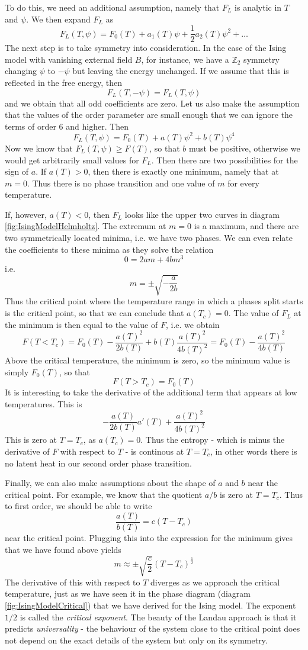 \documentclass[a4paper, draft]{article}
\theoremstyle{own}
\theoremstyle{remark}
\newcommand{\Z}{\mathbb{Z}}
\begin{document}
To do this, we need an additional assumption, namely that $F_L$ is analytic in $T$ and $\psi$. We then expand $F_L$ as
$$
F_L(T, \psi) = F_0(T) + a_1(T) \psi + \frac{1}{2} a_2(T) \psi^2 + \dots
$$
The next step is to take symmetry into consideration. In the case of the Ising model with vanishing external field $B$, for instance, we have a $\Z_2$ symmetry changing $\psi$ to $-\psi$ but leaving the energy unchanged. If we assume that this is reflected in the free energy, then
$$
F_L(T, -\psi) = F_L(T, \psi)
$$
and we obtain that all odd coefficients are zero. Let us also make the assumption that the values of the order parameter are small enough that we can ignore the terms of order 6 and higher. Then
$$
F_L(T, \psi) = F_0(T) + a(T) \psi^2 + b(T)\psi^4
$$
Now we know that $F_L(T, \psi) \geq F(T)$, so that $b$ must be positive, otherwise we would get arbitrarily small values for $F_L$. Then there are two possibilities for the sign of $a$. If $a(T) > 0$, then there is exactly one minimum, namely that at $m = 0$. Thus there is no phase transition and one value of $m$ for every temperature. 

If, however, $a(T) < 0$, then $F_L$ looks like the upper two curves in diagram \ref{fig:IsingModelHelmholtz}. The extremum at $m = 0$ is a maximum, and there are two symmetrically located minima, i.e. we have two phases. We can even relate the coefficients to these minima as they solve the relation
$$
0 = 2 a m + 4 b m^3
$$
i.e.
$$
m = \pm \sqrt{- \frac{a}{2b}}
$$	
Thus the critical point where the temperature range in which a phases split starts is the critical point, so that we can conclude that $a(T_c) = 0$. The value of $F_L$ at the minimum is then equal to the value of $F$, i.e. we obtain
$$
F(T < T_c) = F_0(T) -  \frac{a(T)^2}{2b(T)} + b(T) \frac{a(T)^2}{4b(T)^2} =  F_0(T) -  \frac{a(T)^2}{4b(T)} 	
$$
Above the critical temperature, the minimum is zero, so the minimum value is simply $F_0(T)$, so that 
$$
F( T > T_c) = F_0(T)
$$
It is interesting to take the derivative of the additional term that appears at low temperatures. This is
$$
-  \frac{a(T)}{2b(T)} a'(T) + \frac{a(T)^2}{4b(T)^2}
$$
This is zero at $T = T_c$, as $a(T_c) = 0$. Thus the entropy - which is minus the derivative of $F$ with respect to $T$ - is continous at $T = T_c$, in other words there is no latent heat in our second order phase transition. 

Finally, we can also make assumptions about the shape of $a$ and $b$ near the critical point. For example, we know that the quotient $a / b$ is zero at $T = T_c$. Thus to first order, we should be able to write
$$
\frac{a(T)}{b(T)} = c (T - T_c)
$$
near the critical point. Plugging this into the expression for the minimum gives that we have found above yields
$$
m \approx \pm \sqrt{\frac{c}{2}} (T - T_c)^{\frac{1}{2}} 
$$
The derivative of this with respect to $T$ diverges as we approach the critical temperature, just as we have seen it in the phase diagram (diagram \ref{fig:IsingModelCritical}) that we have derived for the Ising model. The exponent $1/2$ is called the {\em critical exponent}. The beauty of the Landau approach is that it predicts {\em universality} - the behaviour of the system close to the critical point does not depend on the exact details of the system but only on its symmetry. 
\end{document}
